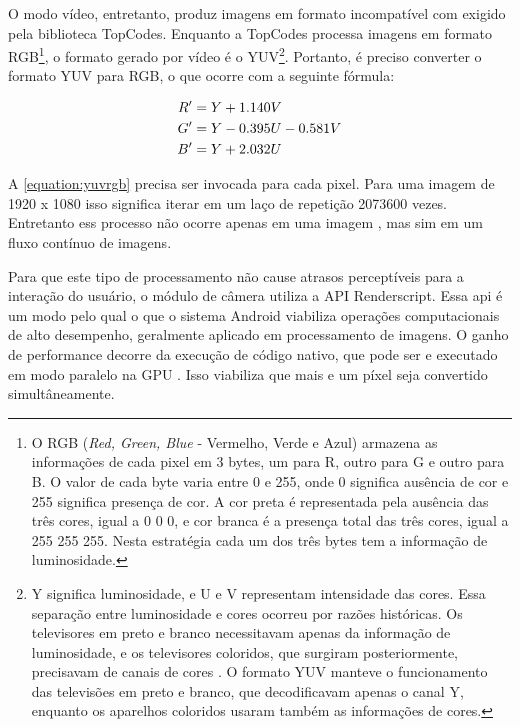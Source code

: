 O modo vídeo, entretanto, produz imagens em formato incompatível com exigido pela biblioteca TopCodes. Enquanto a TopCodes processa imagens em formato RGB\footnote{O RGB (\textit{Red, Green, Blue} - Vermelho, Verde e Azul) armazena as informações de cada pixel em 3 bytes, um para R, outro para G e outro para B. O valor de cada byte varia entre 0 e 255, onde 0 significa ausência de cor e 255 significa presença de cor. A cor preta é representada pela ausência das três cores, igual a 0 0 0, e cor branca é a presença total das três cores, igual a 255 255 255. Nesta estratégia cada um dos três bytes tem a informação de luminosidade.}, o formato gerado por vídeo é o YUV\footnote{Y significa luminosidade, e U e V representam intensidade das cores. Essa separação entre luminosidade e cores ocorreu por razões históricas. Os televisores em preto e branco necessitavam apenas da informação de luminosidade, e os televisores coloridos, que surgiram posteriormente, precisavam de canais de cores \cite{jack_video_2001}. O formato YUV manteve o funcionamento das televisões em preto e branco, que decodificavam apenas o canal Y, enquanto os aparelhos coloridos usaram também as informações de cores.
}. Portanto, é preciso converter o formato YUV para RGB, o que ocorre com a seguinte fórmula:

\begin{equation}
\label{equation:yuvrgb}
\centering
\begin{aligned}
R' &= Y + 1.140V \\
G' &= Y - 0.395U - 0.581V \\
B' &= Y + 2.032U
\end{aligned}
\end{equation}

A \autoref{equation:yuvrgb} precisa ser invocada para cada pixel. Para uma imagem de 1920 x 1080 isso significa iterar em um laço de repetição 2073600 vezes. Entretanto ess processo não ocorre apenas em uma imagem , mas sim em um fluxo contínuo de imagens.

Para que este tipo de processamento não cause atrasos perceptíveis para a interação do usuário, o módulo de câmera utiliza a API Renderscript. Essa api é um modo pelo qual o que o sistema Android viabiliza operações computacionais de alto desempenho, geralmente aplicado em processamento de imagens. O ganho de performance decorre da execução de código nativo, que pode ser e executado em modo paralelo na GPU \cite{sams_introducing_2011}. Isso viabiliza que mais e um píxel seja convertido simultâneamente.

